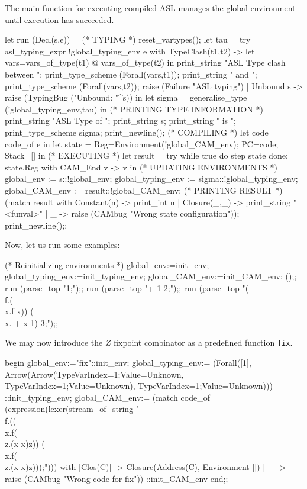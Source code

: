 The main function for executing compiled ASL manages the global
environment until execution has succeeded.
\begin{caml_example}
let run (Decl(s,e)) =
  (* TYPING *)
    reset_vartypes();
    let tau =
        try asl_typing_expr !global_typing_env e
        with TypeClash(t1,t2) ->
              let vars=vars_of_type(t1) @ vars_of_type(t2) in
              print_string "ASL Type clash between ";
              print_type_scheme (Forall(vars,t1));
              print_string " and ";
              print_type_scheme (Forall(vars,t2));
              raise (Failure "ASL typing")
           | Unbound s -> raise (TypingBug ("Unbound: "^s)) in
    let sigma = generalise_type (!global_typing_env,tau) in
  (* PRINTING TYPE INFORMATION *)
    print_string "ASL Type of ";
    print_string s; print_string " is ";
    print_type_scheme sigma; print_newline();
  (* COMPILING *)
    let code = code_of e in
    let state = {Reg=Environment(!global_CAM_env); PC=code; Stack=[]} in
  (* EXECUTING *)
    let result = try while true do step state done; state.Reg 
                 with CAM_End v -> v in
  (* UPDATING ENVIRONMENTS *)
    global_env := s::!global_env;
    global_typing_env := sigma::!global_typing_env;
    global_CAM_env := result::!global_CAM_env;
  (* PRINTING RESULT *)
    (match result
     with Constant(n) -> print_int n
        | Closure(_,_) -> print_string "<funval>"
        | _ -> raise (CAMbug "Wrong state configuration"));
    print_newline();;
\end{caml_example}
Now, let us run some examples:
%
\begin{caml_example}
(* Reinitializing environments *)
global_env:=init_env;
global_typing_env:=init_typing_env;
global_CAM_env:=init_CAM_env;
();;
run (parse_top "1;");;
run (parse_top "+ 1 2;");;
run (parse_top "(\\f.(\\x.f x)) (\\x. + x 1) 3;");;
\end{caml_example}
We may now introduce the $Z$ fixpoint combinator as a predefined 
function {\tt fix}.
%
\begin{caml_example}
begin
  global_env:="fix"::init_env;
  global_typing_env:=
    (Forall([1],
            Arrow(Arrow(TypeVar{Index=1;Value=Unknown},
                        TypeVar{Index=1;Value=Unknown}),
                  TypeVar{Index=1;Value=Unknown})))
   ::init_typing_env;
  global_CAM_env:=
   (match code_of (expression(lexer(stream_of_string
           "\\f.((\\x.f(\\z.(x x)z)) (\\x.f(\\z.(x x)z)));")))
    with [Clos(C)] -> Closure(Address(C), Environment [])
       | _ -> raise (CAMbug "Wrong code for fix"))
   ::init_CAM_env
end;;
\end{caml_example}
